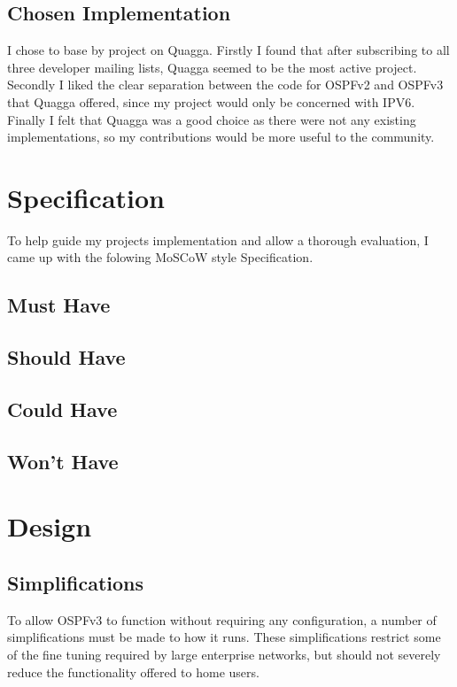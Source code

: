 \documentclass[12pt]{report}
\begin{document}
\section{Chosen Implementation}
I chose to base by project on Quagga. Firstly I found that after subscribing to
all three developer mailing lists, Quagga seemed to be the most active project.
Secondly I liked the clear separation between the code for OSPFv2 and OSPFv3
that Quagga offered, since my project would only be concerned with IPV6.
Finally I felt that Quagga was a good choice as there were not any existing
implementations, so my contributions would be more useful to the community.


\chapter{Specification}
To help guide my projects implementation and allow a thorough evaluation, I
came up with the folowing MoSCoW style Specification.

\section{Must Have}

\section{Should Have}

\section{Could Have}

\section{Won't Have}


\chapter{Design}

\section{Simplifications}
To allow OSPFv3 to function without requiring any configuration, a number of
simplifications must be made to how it runs. These simplifications restrict
some of the fine tuning required by large enterprise networks, but should not
severely reduce the functionality offered to home users. 
\end{document}

